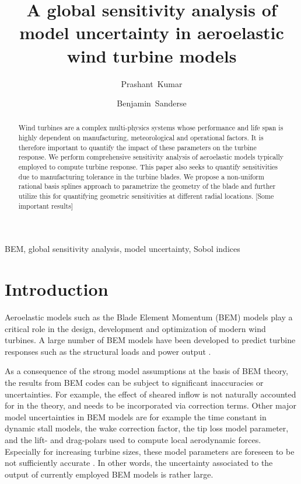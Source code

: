 \documentclass[review]{elsarticle}
\numberwithin{equation}{section}
\numberwithin{equation}{section}
\begin{document}
\begin{frontmatter}
\title{A global sensitivity analysis of model uncertainty in aeroelastic wind turbine models}

\address[cwi]{Centrum Wiskunde \& Informatica (CWI), Amsterdam, The Netherlands}
\author[]{Prashant~Kumar}

\author{Benjamin~Sanderse}

\begin{abstract}
Wind turbines are a complex multi-physics systems whose performance and life span is highly dependent on manufacturing, meteorological and operational factors. It is therefore important to quantify the impact of these parameters on the turbine response. We perform comprehensive sensitivity analysis of aeroelastic models typically employed to compute turbine response. This paper also seeks to quantify sensitivities due to manufacturing tolerance in the turbine blades. We propose a non-uniform rational basis splines approach to parametrize the geometry of the blade and further utilize this for quantifying geometric sensitivities at different radial locations. [Some important results]
\end{abstract}
\begin{keyword}
BEM, global sensitivity analysis, model uncertainty, Sobol indices
\end{keyword}
\end{frontmatter}

\linenumbers

\section{Introduction}
Aeroelastic models such as the Blade Element Momentum (BEM) models \cite{HandBook} play a critical role in the design, development and optimization of modern wind turbines. A large number of BEM models have been developed to predict turbine responses such as the structural loads and power output \cite{Vorpahl2013}. 

As a consequence of the strong model assumptions at the basis of BEM theory, the results from BEM codes can be subject to significant inaccuracies or uncertainties. For example, the effect of sheared inflow \cite{Madsen2012} is not naturally accounted for in the theory, and needs to be incorporated via correction terms. Other major model uncertainties in BEM models are for example the time constant in dynamic stall models, the wake correction factor, the tip loss model parameter, and the lift- and drag-polars used to compute local aerodynamic forces. Especially for increasing turbine sizes, these model parameters  are foreseen to be not sufficiently accurate \cite{Sayed2019}. In other words, the uncertainty associated to the output of currently employed BEM models is rather large. 
\end{document}
